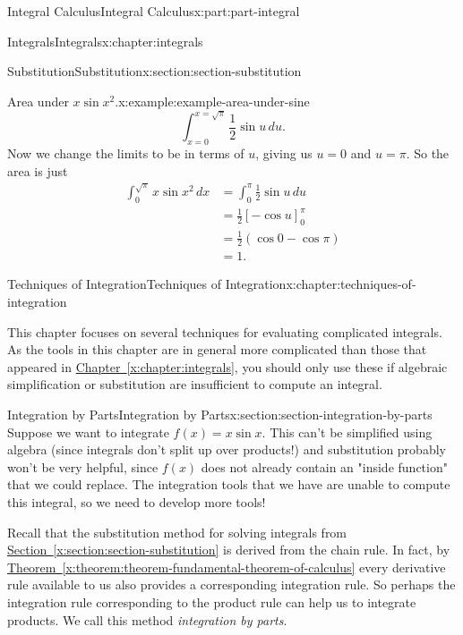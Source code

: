\documentclass[twoside,10pt,]{tufte-book}
\newcommand{\xreffont}{\relax}
\numberwithin{equation}{part}
\begin{document}
\begin{partptx}{Integral Calculus}{}{Integral Calculus}{}{}{x:part:part-integral}
\begin{chapterptx}{Integrals}{}{Integrals}{}{}{x:chapter:integrals}
\begin{sectionptx}{Substitution}{}{Substitution}{}{}{x:section:section-substitution}
\begin{example}{Area under \(x\sin x^{2}\).}{x:example:example-area-under-sine}
\begin{equation*}
\int_{x=0}^{x=\sqrt{\pi}}\frac{1}{2}\sin u\,du.
\end{equation*}
Now we change the limits to be in terms of \(u\), giving us \(u = 0\) and \(u = \pi\). So the area is just%
\begin{align*}
\int_{0}^{\sqrt{\pi}}x\sin x^{2}\,dx & = \int_{0}^{\pi}\frac{1}{2}\sin u\,du \\
& = \frac{1}{2}[-\cos u]_{0}^{\pi} \\
& = \frac{1}{2}(\cos0 - \cos\pi) \\
& = 1. 
\end{align*}
%
\end{example}
\end{sectionptx}
\end{chapterptx}
%
\typeout{************************************************}
\typeout{************************************************}
%
\begin{chapterptx}{Techniques of Integration}{}{Techniques of Integration}{}{}{x:chapter:techniques-of-integration}
\begin{introduction}{}%
This chapter focuses on several techniques for evaluating complicated integrals. As the tools in this chapter are in general more complicated than those that appeared in \hyperref[x:chapter:integrals]{Chapter~{\xreffont\ref{x:chapter:integrals}}}, you should only use these if algebraic simplification or substitution are insufficient to compute an integral.%
\end{introduction}%
%
%
\typeout{************************************************}
\typeout{************************************************}
%
\begin{sectionptx}{Integration by Parts}{}{Integration by Parts}{}{}{x:section:section-integration-by-parts}
Suppose we want to integrate \(f(x) = x\sin x\). This can't be simplified using algebra (since integrals don't split up over products!) and substitution probably won't be very helpful, since \(f(x)\) does not already contain an "inside function" that we could replace. The integration tools that we have are unable to compute this integral, so we need to develop more tools!%
\par
Recall that the substitution method for solving integrals from \hyperref[x:section:section-substitution]{Section~{\xreffont\ref{x:section:section-substitution}}} is derived from the chain rule. In fact, by \hyperref[x:theorem:theorem-fundamental-theorem-of-calculus]{Theorem~{\xreffont\ref{x:theorem:theorem-fundamental-theorem-of-calculus}}} every derivative rule available to us also provides a corresponding integration rule. So perhaps the integration rule corresponding to the product rule can help us to integrate products. We call this method \emph{integration by parts}.%

\end{sectionptx}
\end{chapterptx}
\end{partptx}
\end{document}
